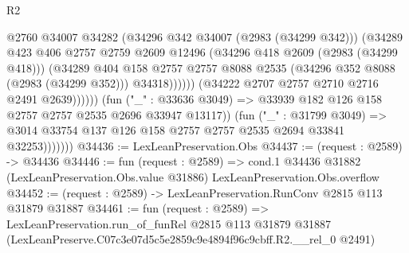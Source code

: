 \begin{lexlean}{R2}
\begin{coremodule}
                                    @2760
                                    @34007
                                    @34282
                                    (@34296 @342 @34007 (@2983 (@34299 @342)))
                                    (@34289
                                      @423
                                      @406
                                      @2757
                                      @2759
                                      @2609
                                      @12496
                                      (@34296 @418 @2609 (@2983 (@34299 @418)))
                                      (@34289
                                        @404
                                        @158
                                        @2757
                                        @2757
                                        @8088
                                        @2535
                                        (@34296 @352 @8088 (@2983 (@34299 @352)))
                                        @34318))))))
                            (@34222 @2707 @2757 @2710 @2716 @2491 @2639))))))
                  (fun ("_" : @33636 @3049) =>
                  @33939 @182 @126 @158 @2757 @2757 @2535 @2696 @33947 @13117))
                (fun ("_" : @31799 @3049) =>
                @3014 @33754 @137 @126 @158 @2757 @2757 @2535 @2694 @33841 @32253)))))))
@34436 := LexLeanPreservation.Obs
@34437 := (request : @2589) -> @34436
@34446 := fun (request : @2589) =>
  cond.{1} @34436 @31882 (LexLeanPreservation.Obs.value @31886) LexLeanPreservation.Obs.overflow
@34452 := (request : @2589) -> LexLeanPreservation.RunConv @2815 @113 @31879 @31887
@34461 := fun (request : @2589) =>
  LexLeanPreservation.run_of_funRel
    @2815
    @113
    @31879
    @31887
    (LexLeanPreserve.C07c3e07d5c5e2859c9e4894f96c9cbff.R2.__rel_0 @2491)
\end{coremodule}
\end{lexlean}
